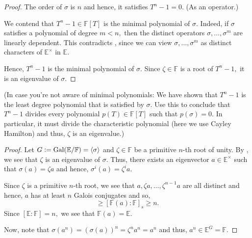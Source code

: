 \primeigenvalue*\label{lem:primeigenvalue2}
\begin{flushright}\hyperref[lem:primeigenvalue]{\upsym}\end{flushright}
\begin{proof}
    The order of $\sigma$ is $n$ and hence, it satisfies $T^n - 1 = 0.$ (As an operator.)

    We contend that $T^n - 1 \in \mathbb{F}[T]$ is the minimal polynomial of $\sigma.$ Indeed, if $\sigma$ satisfies a polynomial of degree $m < n,$ then the distinct operators $\sigma, \ldots, \sigma^m$ are linearly dependent. This contradicts , since we can view $\sigma, \ldots, \sigma^m$ as distinct characters of $\mathbb{E}^\times$ in $\mathbb{E}.$

    Hence, $T^n - 1$ is the minimal polynomial of $\sigma.$ Since $\zeta \in \mathbb{F}$ is a root of $T^n - 1,$ it is an eigenvalue of $\sigma.$
\end{proof}

(In case you're not aware of minimal polynomials: We have shown that $T^n - 1$ is the least degree polynomial that is satisfied by $\sigma.$ Use this to conclude that $T^n - 1$ divides every polynomial $p(T) \in \mathbb{F}[T]$ such that $p(\sigma) = 0.$ In particular, it must divide the characteristic polynomial (here we use Cayley Hamilton) and thus, $\zeta$ is an eigenvalue.)

\cyclicextprimroot*\label{thm:cyclicextprimroot2}
\begin{flushright}\hyperref[thm:cyclicextprimroot]{\upsym}\end{flushright}
\begin{proof}
    Let $G \vcentcolon= \operatorname{Gal}(\mathbb{E}/\mathbb{F}) = \langle \sigma\rangle$ and $\zeta \in \mathbb{F}$ be a primitive $n$-th root of unity. By , we see that $\zeta$ is an eigenvalue of $\sigma.$ Thus, there exists an eigenvector $a \in \mathbb{E}^\times$ such that $\sigma(a) = \zeta a$ and hence, $\sigma^i(a) = \zeta^i a.$

    Since $\zeta$ is a primitive $n$-th root, we see that $a, \zeta a, \ldots, \zeta^{n - 1}a$ are all distinct and hence, $a$ has at least $n$ Galois conjugates and so, 
    \begin{equation*} 
        [\mathbb{F}(a) : \mathbb{F}] \ge [\mathbb{F}(a) : \mathbb{F}]_s \ge n.
    \end{equation*}
    Since $[\mathbb{E} : \mathbb{F}] = n,$ we see that $\mathbb{F}(a) = \mathbb{E}.$ 

    Now, note that $\sigma(a^n) = (\sigma(a))^n = \zeta^na^n = a^n$ and thus, $a^n \in \mathbb{E}^G = \mathbb{F}.$
\end{proof}

